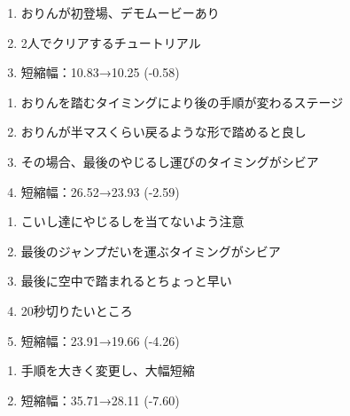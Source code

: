 \begin{enumerate}[label={\sarrow}]
\item おりんが初登場、デモムービーあり
\item 2人でクリアするチュートリアル
\item 短縮幅：10.83→10.25 (-0.58)
\end{enumerate}



\begin{enumerate}[label={\sarrow}]
\item おりんを踏むタイミングにより後の手順が変わるステージ
\item おりんが半マスくらい戻るような形で踏めると良し
\item その場合、最後のやじるし運びのタイミングがシビア
\item 短縮幅：26.52→23.93 (-2.59)
\end{enumerate}



\begin{enumerate}[label={\sarrow}]
\item こいし達にやじるしを当てないよう注意
\item 最後のジャンプだいを運ぶタイミングがシビア
\item 最後に空中で踏まれるとちょっと早い
\item 20秒切りたいところ
\item 短縮幅：23.91→19.66 (-4.26)
\end{enumerate}



\begin{enumerate}[label={\sarrow}]
\item 手順を大きく変更し、大幅短縮
\item 短縮幅：35.71→28.11 (-7.60)
\end{enumerate}



